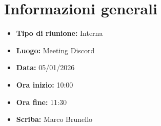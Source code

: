 \section{Informazioni generali}

\begin{itemize}
    \item \textbf{Tipo di riunione:} Interna
    \item \textbf{Luogo:} Meeting Discord
    \item \textbf{Data:} 05/01/2026
    \item \textbf{Ora inizio:} 10:00
    \item \textbf{Ora fine:} 11:30
    \item \textbf{Scriba:} Marco Brunello
\end{itemize}